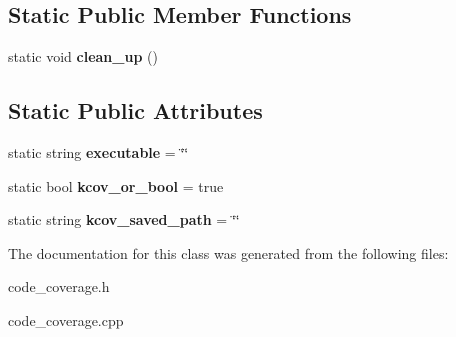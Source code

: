 \subsection*{Static Public Member Functions}
\begin{DoxyCompactItemize}
\item 
\mbox{\label{classCode__coverage_a05bc90d8d0df8d7bed991d1f3845bc29}} 
static void {\bfseries clean\+\_\+up} ()
\end{DoxyCompactItemize}
\subsection*{Static Public Attributes}
\begin{DoxyCompactItemize}
\item 
\mbox{\label{classCode__coverage_a04682a773b71dfa48fb4fd4a73222083}} 
static string {\bfseries executable} = \char`\"{}\char`\"{}
\item 
\mbox{\label{classCode__coverage_aed9261283a4e3caa7378aacbbc0ab611}} 
static bool {\bfseries kcov\+\_\+or\+\_\+bool} = true
\item 
\mbox{\label{classCode__coverage_a5eea4af43ece730c30306ea3d226ebdb}} 
static string {\bfseries kcov\+\_\+saved\+\_\+path} = \char`\"{}\char`\"{}
\end{DoxyCompactItemize}


The documentation for this class was generated from the following files\+:\begin{DoxyCompactItemize}
\item 
code\+\_\+coverage.\+h\item 
code\+\_\+coverage.\+cpp\end{DoxyCompactItemize}
